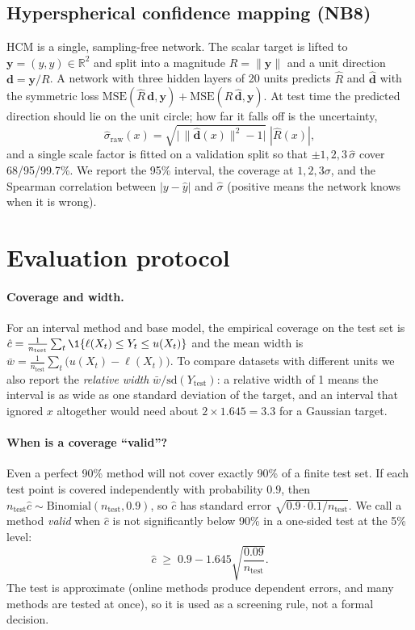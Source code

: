 \documentclass[11pt]{article}
\begin{document}
\subsection{Hyperspherical confidence mapping (NB8)}
HCM \cite{choi2026hcm} is a single, sampling-free network. The scalar target is lifted to $\mathbf y=(y,y)\in\mathbb R^2$ and
split into a magnitude $R=\|\mathbf y\|$ and a unit direction $\mathbf d=\mathbf y/R$. A network with three hidden layers of 20
units predicts $\hat R$ and $\hat{\mathbf d}$ with the symmetric loss
$\mathrm{MSE}(\hat R\,\mathbf d,\mathbf y)+\mathrm{MSE}(R\,\hat{\mathbf d},\mathbf y)$. At test time the predicted direction should lie on the
unit circle; how far it falls off is the uncertainty,
\begin{equation}
\hat\sigma_{\text{raw}}(x)=\sqrt{\big|\,\|\hat{\mathbf d}(x)\|^2-1\big|}\;|\hat R(x)|,
\end{equation}
and a single scale factor is fitted on a validation split so that $\pm1,2,3\,\hat\sigma$ cover 68/95/99.7\%. We report the 95\%
interval, the coverage at $1,2,3\sigma$, and the Spearman correlation between $|y-\hat y|$ and $\hat\sigma$ (positive means the
network knows when it is wrong).

\section{Evaluation protocol}\label{sec:eval}
\paragraph{Coverage and width.} For an interval method and base model, the empirical coverage on the test set is
$\hat c=\frac1{n_{\text{test}}}\sum_{t}\1\{\ell(X_t)\le Y_t\le u(X_t)\}$ and the mean width is
$\bar w=\frac1{n_{\text{test}}}\sum_t\big(u(X_t)-\ell(X_t)\big)$. To compare datasets with different units we also report the
\emph{relative width} $\bar w/\mathrm{sd}(Y_{\text{test}})$: a relative width of 1 means the interval is as wide as one standard
deviation of the target, and an interval that ignored $x$ altogether would need about $2\times1.645=3.3$ for a Gaussian target.

\paragraph{When is a coverage ``valid''?} Even a perfect 90\% method will not cover exactly 90\% of a finite test set. If each test
point is covered independently with probability $0.9$, then $n_{\text{test}}\hat c\sim\mathrm{Binomial}(n_{\text{test}},0.9)$, so
$\hat c$ has standard error $\sqrt{0.9\cdot0.1/n_{\text{test}}}$. We call a method \emph{valid} when $\hat c$ is not significantly
below 90\% in a one-sided test at the 5\% level:
\begin{equation}\label{eq:valid}
\hat c\;\ge\;0.9-1.645\sqrt{\frac{0.09}{n_{\text{test}}}} .
\end{equation}
The test is approximate (online methods produce dependent errors, and many methods are tested at once), so it is used as a
screening rule, not a formal decision.
\end{document}
